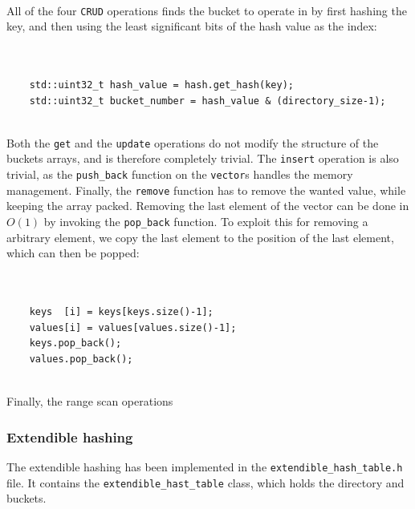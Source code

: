 \documentclass[11pt]{article} %
\begin{document}
\\
All of the four \verb|CRUD| operations finds the bucket to operate in by first hashing the key, and then using the least significant bits of the hash value as the index:\\
\\
\begin{fminipage}{\linewidth}
\begin{lstlisting}[]% Start your code-block

    std::uint32_t hash_value = hash.get_hash(key);
    std::uint32_t bucket_number = hash_value & (directory_size-1);
\end{lstlisting}
\end{fminipage}
\vphantom{fill}\\
Both the \verb|get| and the \verb|update| operations do not modify the structure of the buckets arrays, and is therefore completely trivial. The \verb|insert| operation is also trivial, as the \verb|push_back| function on the \verb|vector|s handles the memory management. Finally, the \verb|remove| function has to remove the wanted value, while keeping the array packed. Removing the last element of the vector can be done in $O(1)$ by invoking the \verb|pop_back| function. To exploit this for removing a arbitrary element, we copy the last element to the position of the last element, which can then be popped:\\
\\
\begin{fminipage}{\linewidth}
\begin{lstlisting}[]% Start your code-block

    keys  [i] = keys[keys.size()-1];
    values[i] = values[values.size()-1];
    keys.pop_back();
    values.pop_back();
\end{lstlisting}
\end{fminipage}
\vphantom{fill}\\
Finally, the range scan operations 
\subsubsection{Extendible hashing}
\label{subsubsec:implementation_extendible_hashing}
The extendible hashing has been implemented in the \verb|extendible_hash_table.h| file. It contains the \verb|extendible_hast_table| class, which holds the directory and buckets.
\end{document}
